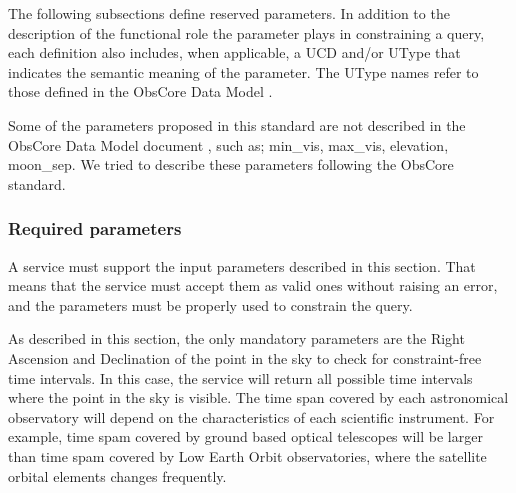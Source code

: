 \documentclass[11pt,a4paper]{ivoa}
\begin{document}
The following subsections define reserved parameters. In addition to the
description of the functional role the parameter plays in constraining a
query, each definition also includes, when applicable, a UCD and/or
UType that indicates the semantic meaning of the parameter. The UType
names refer to those defined in the ObsCore Data Model .

Some of the parameters proposed in this standard are not described in
the ObsCore Data Model document , such as; min\_vis, max\_vis,
elevation, moon\_sep. We tried to describe these parameters following
the ObsCore standard.

\subsubsection{Required parameters}
A service must support the input parameters described in this section.
That means that the service must accept them as valid ones without
raising an error, and the parameters must be properly used to constrain
the query.

As described in this section, the only mandatory parameters are the
Right Ascension and Declination of the point in the sky to check for
constraint-free time intervals. In this case, the service will return
all possible time intervals where the point in the sky is visible. The
time span covered by each astronomical observatory will depend on the
characteristics of each scientific instrument. For example, time spam
covered by ground based optical telescopes will be larger than time spam
covered by Low Earth Orbit observatories, where the satellite orbital
elements changes frequently.
\end{document}
